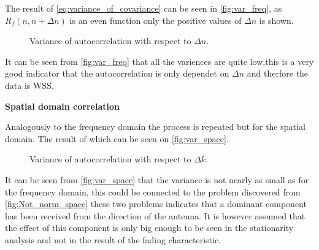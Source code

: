 The result of \autoref{eq:variance_of_covariance} can be seen in \autoref{fig:var_freq}, as $R_f(n,n+\Delta n)$ is an even function only the positive values of $\Delta n$ is shown.

\begin{figure}[H]
\centering

\caption{Variance of autocorrelation with respect to $\Delta n$.}
\label{fig:var_freq}
\end{figure}

It can be seen from \autoref{fig:var_freq} that all the variences are quite low,this is a very good indicator that the autocorrelation is only dependet on $\Delta n$ and therfore the data is WSS.

\textbf{Spatial domain correlation}

Analogously to the frequency domain the process is repeated but for the spatial domain. The result of which can be seen on \autoref{fig:var_space}.

\begin{figure}[H]
\centering

\caption{Variance of autocorrelation with respect to $\Delta k$.}
\label{fig:var_space}
\end{figure}

It can be seen from \autoref{fig:var_space} that the variance is not nearly as small as for the frequency domain, this could be connected to the problem discovered from \autoref{fig:Not_norm_space} these two problems indicates that a dominant component has been received from the direction of the antenna. It is however assumed that the effect of this component is only big enough to be seen in the stationarity analysis and not in the result of the fading characteristic.
